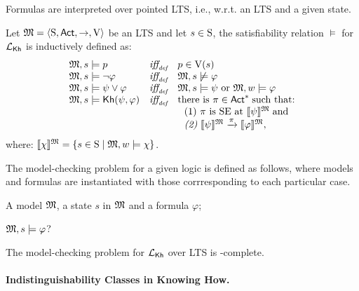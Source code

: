 Formulas are interpreted over pointed LTS, i.e., w.r.t. an LTS and a given state. 

\begin{definition} \label{def:semantics-kh}
    Let $\model = \tup{\S,\Act,\ra,\V}$ be an LTS and let $s\in\S$, the satisfiability relation $\models$ for $\Khlogic$ is inductively defined as:
    \[
    \begin{array}{l@{\ \ \ }c@{\ \ \  }l}
    \model, s \models p & \iffdef & p \in \V(s) \\
    \model, s\models \neg\varphi & \iffdef & \model, s \not\models \varphi \\
    \model, s \models \psi\vee\varphi & \iffdef & \model, s \models \psi \mbox{ or }\model, w \models \varphi \\
    \model, s \models \kh(\psi,\varphi) & \iffdef & \text{there is } \plan \in \Act^* \;\text{such that:} \\
    & & \ \ \text{\rm (1)} \ \plan \text{ is SE at }  \truthset{\model}{\psi}\; \text{and} \\
    & & \ \ \text{\em (2)} \ \truthset{\model}{\psi} \reach{\plan} \truthset{\model}{\varphi}, 
    \end{array}
    \]      where: $\truthset{\model}{\chi} = \csetsc{s\in\S}{\model,w\models\chi}$. 
\end{definition}

The model-checking problem for a given logic is defined as follows, where models and formulas are instantiated with those corrresponding to each particular case. 

\begin{description} \itemsep 0cm
    \item[Input:] A model $\model$, a state $s$ in $\model$ and a formula $\varphi$;
    \item[Output:] $\model,s\models\varphi$?
\end{description}

\begin{proposition}
    The model-checking problem for $\Khlogic$ over LTS is \PSPACE-complete.
\end{proposition}

\paragraph{Indistinguishability Classes in Knowing How.}

